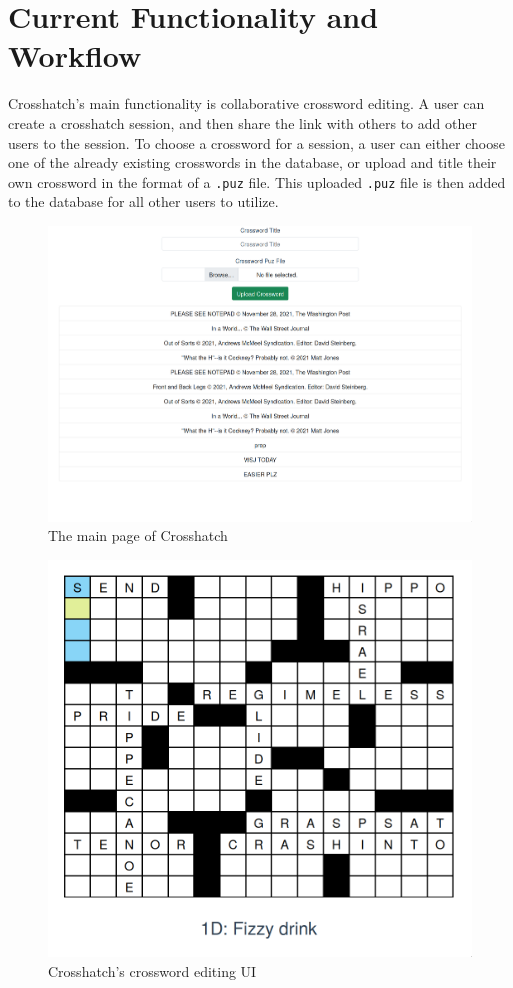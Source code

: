 \documentclass{article}
\begin{document}
\section{Current Functionality and Workflow}

Crosshatch's main functionality is collaborative crossword editing. A user can create a crosshatch session, and then
share the link with others to add other users to the session. To choose a crossword for a session, a user can either choose one of the
already existing crosswords in the database, or upload and title their own crossword in the format of a \texttt{.puz} file. This uploaded \texttt{.puz} file is then added to the database
for all other users to utilize.

\begin{figure}[t]
  \centering
  \includegraphics[width = \linewidth]{img/list.png}
  \caption{The main page of Crosshatch}
  \label{list}
\end{figure}
\begin{figure}[t]
  \centering
  \includegraphics[width = \linewidth]{img/crossword.png}
  \caption{Crosshatch's crossword editing UI}
  \label{cross}
\end{figure}
\end{document}
